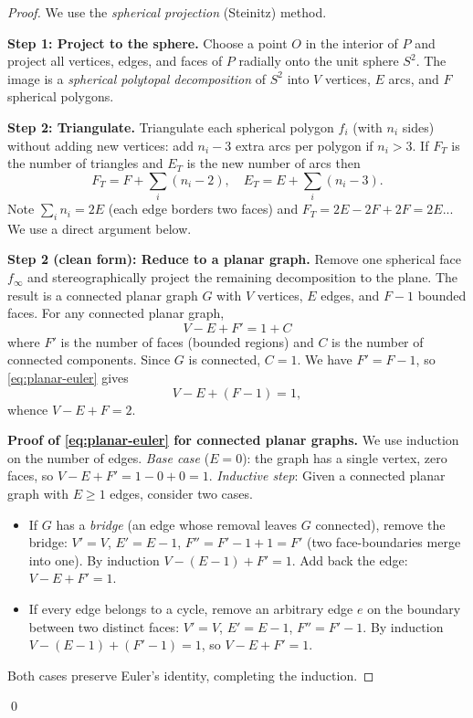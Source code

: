 \begin{proof}
We use the \emph{spherical projection} (Steinitz) method.

\medskip
\noindent\textbf{Step 1: Project to the sphere.}
Choose a point $O$ in the interior of $P$ and project all vertices, edges,
and faces of $P$ radially onto the unit sphere $S^2$.  The image is a
\emph{spherical polytopal decomposition} of $S^2$ into $V$ vertices, $E$ arcs,
and $F$ spherical polygons.

\medskip
\noindent\textbf{Step 2: Triangulate.}
Triangulate each spherical polygon $f_i$ (with $n_i$ sides) without adding
new vertices: add $n_i - 3$ extra arcs per polygon if $n_i > 3$.  If
$F_T$ is the number of triangles and $E_T$ is the new number of arcs then
\[
  F_T = F + \sum_i (n_i - 2), \quad E_T = E + \sum_i (n_i - 3).
\]
Note $\sum_i n_i = 2E$ (each edge borders two faces) and $F_T = 2E - 2F + 2F =
2E$... We use a direct argument below.

\medskip
\noindent\textbf{Step 2 (clean form): Reduce to a planar graph.}
Remove one spherical face $f_\infty$ and stereographically project the
remaining decomposition to the plane.  The result is a connected planar
graph $G$ with $V$ vertices, $E$ edges, and $F-1$ bounded faces.  For any
connected planar graph,
\begin{equation}
  V - E + F' = 1 + C
  \label{eq:planar-euler}
\end{equation}
where $F'$ is the number of faces (bounded regions) and $C$ is the number of
connected components.  Since $G$ is connected, $C = 1$.  We have $F' = F - 1$,
so \eqref{eq:planar-euler} gives
\[
  V - E + (F-1) = 1,
\]
whence $V - E + F = 2$.

\medskip
\noindent\textbf{Proof of \eqref{eq:planar-euler} for connected planar graphs.}
We use induction on the number of edges.  \emph{Base case} ($E = 0$): the graph
has a single vertex, zero faces, so $V - E + F' = 1 - 0 + 0 = 1$.  \emph{Inductive
step}: Given a connected planar graph with $E \geq 1$ edges,
consider two cases.
\begin{itemize}
  \item If $G$ has a \emph{bridge} (an edge whose removal leaves $G$
        connected), remove the bridge: $V' = V$, $E' = E-1$, $F'' = F'-1+1 = F'$
        (two face-boundaries merge into one).  By induction $V - (E-1) + F' = 1$.
        Add back the edge: $V - E + F' = 1$.
  \item If every edge belongs to a cycle, remove an arbitrary edge $e$ on the
        boundary between two distinct faces: $V' = V$, $E' = E-1$, $F'' = F'-1$.
        By induction $V - (E-1) + (F'-1) = 1$, so $V - E + F' = 1$.
\end{itemize}
Both cases preserve Euler's identity, completing the induction.
\end{proof}
\qed

